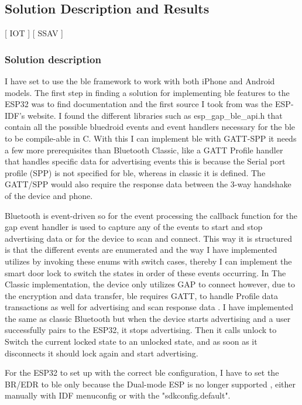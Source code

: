\subsection{Solution Description and Results}
[ IOT ] [ SSAV ] 
\newline
\subsubsection{\textbf{Solution description}}
 I have set to use the \gls{ble} framework to work with both iPhone and Android models. The first step in finding a solution for implementing \gls{ble} features to the ESP32 was to find documentation and the first source I took from was the ESP-IDF's website. I found the different libraries such as esp\_gap\_ble\_api.h that contain all the possible bluedroid events and event handlers necessary for the \gls{ble} to be compile-able in C. With this I can implement \gls{ble} with GATT-SPP it needs a few more prerequisites than Bluetooth Classic, like a GATT Profile handler that handles specific data for advertising events this is because the Serial port profile (SPP) is not specified for \gls{ble}, whereas in classic it is defined. The GATT/SPP would also require the response data between the 3-way handshake of the device and phone.
 
 Bluetooth is event-driven so for the event processing the callback function for the gap event handler is used to capture any of the events to start and stop advertising data or for the device to scan and connect. This way it is structured is that the different events are enumerated and the way I have implemented utilizes by invoking these enums with switch cases, thereby I can implement the smart door lock to switch the states in order of these events occurring. In The Classic implementation, the device only utilizes GAP to connect however, due to the encryption and data transfer, \gls{ble} requires GATT, to handle Profile data transactions as well for advertising and scan response data \cite{ESPBLEGAP}. I have implemented the same as classic Bluetooth but when the device starts advertising and a user successfully pairs to the ESP32, it stops advertising. Then it calls unlock to Switch the current locked state to an unlocked state, and as soon as it disconnects it should lock again and start advertising. 

For the ESP32 to set up with the correct \gls{ble} configuration, I have to set the BR/EDR to \gls{ble} only because the Dual-mode ESP is no longer supported \cite{esp32beans}, either manually with IDF menuconfig or with the "sdkconfig.default". 


